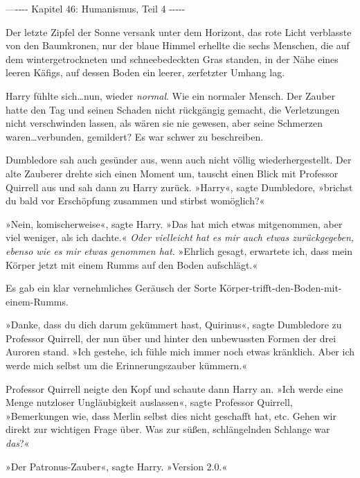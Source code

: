 

\hypertarget{humanismus-teil-4}{%

—\/-\/-\/-\/- Kapitel 46: Humanismus, Teil 4 -\/-\/-\/-\/-

Der letzte Zipfel der Sonne versank unter dem Horizont, das rote Licht verblasste von den Baumkronen, nur der blaue Himmel erhellte die sechs Menschen, die auf dem wintergetrockneten und schneebedeckten Gras standen, in der Nähe eines leeren Käfigs, auf dessen Boden ein leerer, zerfetzter Umhang lag.

Harry fühlte sich…nun, wieder \emph{normal}. Wie ein normaler Mensch. Der Zauber hatte den Tag und seinen Schaden nicht rückgängig gemacht, die Verletzungen nicht verschwinden lassen, als wären sie nie gewesen, aber seine Schmerzen waren…verbunden, gemildert? Es war schwer zu beschreiben.

Dumbledore sah auch gesünder aus, wenn auch nicht völlig wiederhergestellt. Der alte Zauberer drehte sich einen Moment um, tauscht einen Blick mit Professor Quirrell aus und sah dann zu Harry zurück. »Harry«, sagte Dumbledore, »brichst du bald vor Erschöpfung zusammen und stirbst womöglich?«

»Nein, komischerweise«, sagte Harry. »Das hat mich etwas mitgenommen, aber viel weniger, als ich dachte.« \emph{Oder vielleicht hat es mir auch etwas zurückgegeben, ebenso wie es mir etwas genommen hat.} »Ehrlich gesagt, erwartete ich, dass mein Körper jetzt mit einem Rumms auf den Boden aufschlägt.«

Es gab ein klar vernehmliches Geräusch der Sorte Körper-trifft-den-Boden-mit-einem-Rumms.

»Danke, dass du dich darum gekümmert hast, Quirinus«, sagte Dumbledore zu Professor Quirrell, der nun über und hinter den unbewussten Formen der drei Auroren stand. »Ich gestehe, ich fühle mich immer noch etwas kränklich. Aber ich werde mich selbst um die Erinnerungszauber kümmern.«

Professor Quirrell neigte den Kopf und schaute dann Harry an. »Ich werde eine Menge nutzloser Ungläubigkeit auslassen«, sagte Professor Quirrell, »Bemerkungen wie, dass Merlin selbst dies nicht geschafft hat, etc. Gehen wir direkt zur wichtigen Frage über. Was zur süßen, schlängelnden Schlange war \emph{das}?«

»Der Patronus-Zauber«, sagte Harry. »Version 2.0.«

}
